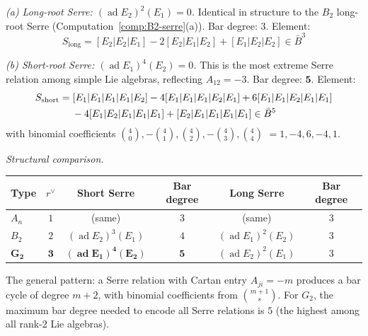 \begin{computation}
\label{comp:G2-serre}

\emph{(a) Long-root Serre:
$(\operatorname{ad} E_2)^2(E_1) = 0$.}
Identical in structure to the $B_2$ long-root Serre
(Computation~\ref{comp:B2-serre}(a)).
Bar degree: $3$. Element:
\[
S_{\mathrm{long}} = [E_2|E_2|E_1] - 2[E_2|E_1|E_2]
+ [E_1|E_2|E_2] \in \bar{B}^3
\]

\emph{(b) Short-root Serre: $(\operatorname{ad} E_1)^4(E_2) = 0$.}
This is the most extreme Serre relation among simple Lie algebras,
reflecting $A_{12} = -3$. Bar degree: $\mathbf{5}$. Element:
\begin{align}
S_{\mathrm{short}} &= [E_1|E_1|E_1|E_1|E_2]
- 4[E_1|E_1|E_1|E_2|E_1]
+ 6[E_1|E_1|E_2|E_1|E_1] \notag \\
&\quad\; - 4[E_1|E_2|E_1|E_1|E_1]
+ [E_2|E_1|E_1|E_1|E_1]
\in \bar{B}^5
\end{align}
with binomial coefficients
$\binom{4}{0}, -\binom{4}{1}, \binom{4}{2}, -\binom{4}{3},
\binom{4}{4}$
$= 1, -4, 6, -4, 1$.

\emph{Structural comparison.}
\begin{center}
\renewcommand{\arraystretch}{1.2}
\begin{tabular}{lccccc}
\textbf{Type} & \textbf{$r^\vee$} &
\textbf{Short Serre} & \textbf{Bar degree} &
\textbf{Long Serre} & \textbf{Bar degree} \\
\hline
$A_n$ & $1$ & (same) & $3$ & (same) & $3$ \\
$B_2$ & $2$ & $(\operatorname{ad} E_2)^3(E_1)$ & $4$ &
 $(\operatorname{ad} E_1)^2(E_2)$ & $3$ \\
$\mathbf{G_2}$ & $\mathbf{3}$ &
 $\mathbf{(\operatorname{ad} E_1)^4(E_2)}$ & $\mathbf{5}$ &
 $(\operatorname{ad} E_2)^2(E_1)$ & $3$
\end{tabular}
\end{center}
The general pattern: a Serre relation with Cartan entry $A_{ji} = -m$
produces a bar cycle of degree $m+2$, with binomial coefficients
from $\binom{m+1}{s}$. For $G_2$, the maximum bar degree needed
to encode all Serre relations is $5$ (the highest among all rank-2
Lie algebras).
\end{computation}

